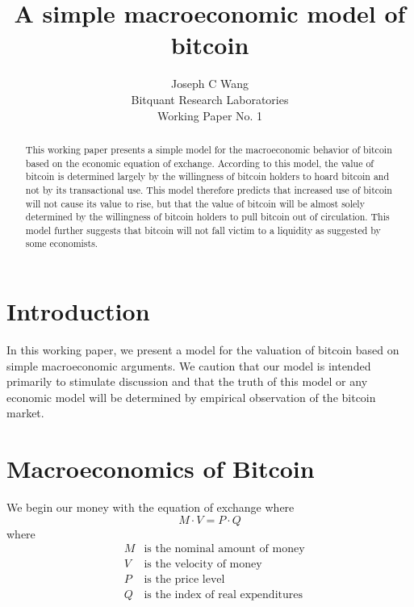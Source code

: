\title{A simple macroeconomic model of bitcoin}
\author{Joseph C Wang\\
\small Bitquant Research Laboratories\\
\small Working Paper No. 1}

\maketitle
\begin{abstract}
This working paper presents a simple model for the macroeconomic
behavior of bitcoin based on the economic equation of exchange.
According to this model, the value of bitcoin is determined largely by
the willingness of bitcoin holders to hoard bitcoin and not by its
transactional use.  This model therefore predicts that increased use
of bitcoin will not cause its value to rise, but that the value of
bitcoin will be almost solely determined by the willingness of bitcoin
holders to pull bitcoin out of circulation.  This model further
suggests that bitcoin will not fall victim to a liquidity as suggested
by some economists.
\end{abstract}

\section{Introduction} 

In this working paper, we present a model for the valuation of bitcoin
based on simple macroeconomic arguments.  We caution that our model is
intended primarily to stimulate discussion and that the truth of this
model or any economic model will be determined by empirical
observation of the bitcoin market.

\section{Macroeconomics of Bitcoin}

We begin our money with the equation of exchange where
\begin{equation}
M \cdot V = P \cdot Q
\end{equation}
where
\begin{eqnarray*}
& M & \mbox{is the nominal amount of money}\\
& V & \mbox{is the velocity of money}\\
& P & \mbox{is the price level}\\
& Q & \mbox{is the index of real expenditures}\\
\end{eqnarray*}

